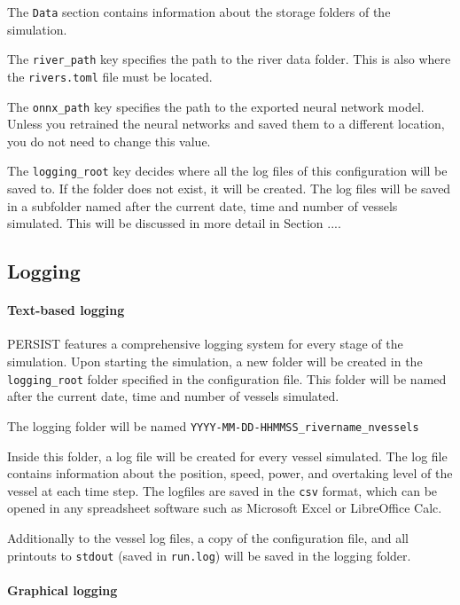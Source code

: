 \documentclass[
	a4paper, %
	12pt, %
]{persist}
\begin{document}
The \verb|Data| section contains information about the storage folders of the simulation.

The \verb|river_path| key specifies the path to the river data folder. This is also where the \verb|rivers.toml| file must be located.

The \verb|onnx_path| key specifies the path to the exported neural network model. Unless you retrained the neural networks and saved them to a different location, you do not need to change this value.

The \verb|logging_root| key decides where all the log files of this configuration will be saved to. If the folder does not exist, it will be created. The log files will be saved in a subfolder named after the current date, time and number of vessels simulated. This will be discussed in more detail in Section ....

\subsection{Logging}

\paragraph{Text-based logging}

PERSIST features a comprehensive logging system for every stage of the simulation. Upon starting the simulation, a new folder will be created in the \verb|logging_root| folder specified in the configuration file. This folder will be named after the current date, time and number of vessels simulated. 
\begin{note}
	The logging folder will be named \verb|YYYY-MM-DD-HHMMSS_rivername_nvessels|
\end{note}

Inside this folder, a log file will be created for every vessel simulated. The log file contains information about the position, speed, power, and overtaking level of the vessel at each time step. The logfiles are saved in the \verb|csv| format, which can be opened in any spreadsheet software such as Microsoft Excel or LibreOffice Calc.

Additionally to the vessel log files, a copy of the configuration file, and all printouts to \verb|stdout| (saved in \verb|run.log|) will be saved in the logging folder. 

\paragraph{Graphical logging}
\end{document}
